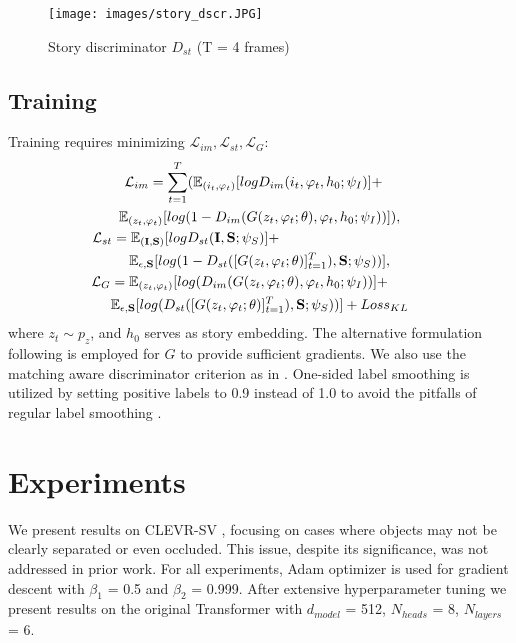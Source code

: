 \documentclass{article}
\begin{document}
\begin{figure}[t]
\centering
\texttt{[image: images/story\_dscr.JPG]}
\caption{Story discriminator $D_{st}$ (T = 4 frames)}
\label{fig:st_dscr}
\end{figure}

\subsection{Training}
Training requires minimizing $\mathcal{L}_{im},\mathcal{L}_{st}, \mathcal{L}_G$: \hfill
\vspace{-0.3cm}
\begin{multline*} 
\hspace{-0.3cm}
\mathcal{L}_{im} =
\sum_{t=1}^T ( 
\mathbb{E}_{(i_t, \varphi_t)} [logD_{im}(i_t, \varphi_t, h_0; \psi_I)] + \\
\mathbb{E}_{(z_t, \varphi_t)} [log(1-D_{im}(G(z_t, \varphi_t;\theta), \varphi_t, h_0; \psi_I))] ), \\
\hspace{-3.7cm}
\mathcal{L}_{st} =
\mathbb{E}_{(\mathbf{I}, \mathbf{S})} [logD_{st}(\mathbf{I}, \mathbf{S}; \psi_S)] + \\
\mathbb{E}_{\epsilon, \mathbf{S}} [log(1-D_{st}([G(z_t, \varphi_t; \theta)]_{t=1}^T), \mathbf{S};\psi_S))], \\
\hspace{-1.0cm}
\mathcal{L}_G = 
\mathbb{E}_{(z_t, \varphi_t)} [log(D_{im}(G(z_t, \varphi_t;\theta), \varphi_t, h_0; \psi_I))] + \\
\mathbb{E}_{\epsilon, \mathbf{S}} [log(D_{st}([G(z_t, \varphi_t; \theta)]_{t=1}^T), \mathbf{S};\psi_S))] +
Loss_{KL}    
\end{multline*}
where $z_t \sim p_z$, and $h_0$ serves as story embedding. The alternative formulation following \cite{goodfellow2014gans} is employed for $G$ to provide sufficient gradients. We also
use the matching aware discriminator criterion as in \cite{ref2}. One-sided label smoothing is utilized by setting positive labels to 0.9 instead of 1.0 to avoid the pitfalls of regular label smoothing \cite{ref4}.



\section{Experiments}
\label{sec:experiments}
We present results on CLEVR-SV \cite{clevr}, focusing on cases where objects may not be clearly separated or even occluded. This issue, despite its significance, was not addressed in prior work. For all experiments, Adam optimizer \cite{adam} is used for gradient descent with $\beta_1$ = 0.5 and $\beta_2$ = 0.999. After extensive hyperparameter tuning we present results on the original Transformer with $d_{model}$ = 512, $N_{heads}$ = 8, $N_{layers}$ = 6. 
\end{document}

